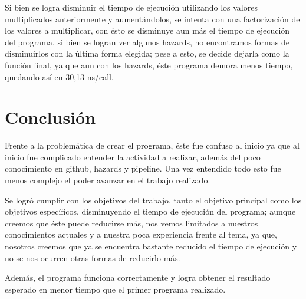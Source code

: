 \documentclass[12pt,letterpaper]{article}
\begin{document}
Si bien se logra disminuir el tiempo de ejecución utilizando los valores multiplicados anteriormente y aumentándolos, se intenta con una factorización de los valores a multiplicar, con ésto se disminuye aun más el tiempo de ejecución del programa, si bien se logran ver algunos hazards, no encontramos formas de disminuirlos con la última forma elegida; pese a esto, se decide dejarla como la función final, ya que aun con los hazards, éste programa demora menos tiempo, quedando así en 30,13 ns/call.

\newpage
\section{Conclusión}
Frente a la problemática de crear el programa, éste fue confuso al inicio ya que al inicio fue complicado entender la actividad a realizar, además del poco conocimiento en github, hazards y pipeline. Una vez entendido todo esto fue menos complejo el poder avanzar en el trabajo realizado.

Se logró cumplir con los objetivos del trabajo, tanto el objetivo principal como los objetivos específicos, disminuyendo el tiempo de ejecución del programa; aunque creemos que éste puede reducirse más, nos vemos limitados a nuestros conocimientos actuales y a nuestra poca experiencia frente al tema, ya que, nosotros creemos que ya se encuentra bastante reducido el tiempo de ejecución y no se nos ocurren otras formas de reducirlo más.

Además, el programa funciona correctamente y logra obtener el resultado esperado en menor tiempo que el primer programa realizado.

\newpage
{}


\end{document}
